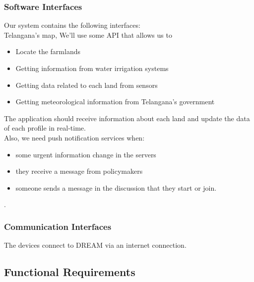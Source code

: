     \subsubsection{Software Interfaces}
    Our system contains the following interfaces:\\
    Telangana’s map, We’ll use some API that allows us to
\begin{itemize}
    \item Locate the farmlands
    \item Getting information from water irrigation systems
    \item Getting data related to each land from sensors
    \item Getting meteorological information from Telangana’s government
\end{itemize}
The application should receive information about each land and update the data of each profile in real-time.\\
Also, we need push notification services when:
\begin{itemize}
    \item some urgent information change in the servers 
    \item they receive a message from policymakers
    \item someone sends a message in the discussion that they start or join.
\end{itemize}.

    \subsubsection{Communication Interfaces}
    The devices connect to DREAM via an internet connection.
\clearpage
\subsection{Functional Requirements}
